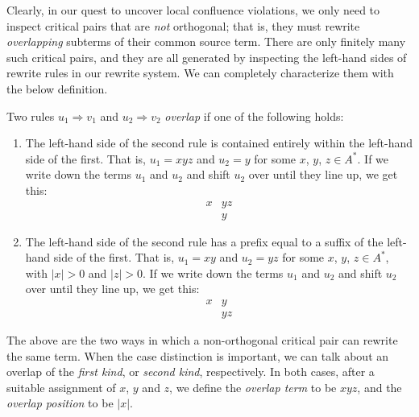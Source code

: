 \documentclass[../generics]{subfiles}
\begin{document}
Clearly, in our quest to uncover local confluence violations, we only need to inspect critical pairs that are \emph{not} orthogonal; that is, they must rewrite \emph{overlapping} subterms of their common source term. There are only finitely many such critical pairs, and they are all generated by inspecting the left-hand sides of rewrite rules in our rewrite system. We can completely characterize them with the below definition.
\begin{definition}\label{overlappingrules}
Two rules $u_1\Rightarrow v_1$ and $u_2\Rightarrow v_2$ \emph{overlap} if one of the following holds:
\begin{enumerate}
\item The left-hand side of the second rule is contained entirely within the left-hand side of the first. That is, $u_1=xyz$ and $u_2=y$ for some $x$, $y$, $z\in A^*$. If we write down the terms $u_1$ and $u_2$ and shift $u_2$ over until they line up, we get this:
\begin{align*}
x&yz\\
&y
\end{align*}
\item The left-hand side of the second rule has a prefix equal to a suffix of the left-hand side of the first. That is, $u_1=xy$ and $u_2=yz$ for some $x$, $y$, $z\in A^*$, with $|x|>0$ and $|z|>0$. If we write down the terms $u_1$ and $u_2$ and shift $u_2$ over until they line up, we get this:
\begin{align*}
x&y\\
&yz
\end{align*}
\end{enumerate}
The above are the two ways in which a non-orthogonal critical pair can rewrite the same term. When the case distinction is important, we can talk about an overlap of the \emph{first kind}, or \emph{second kind}, respectively. In both cases, after a suitable assignment of $x$, $y$ and $z$, we define the \emph{overlap term} to be $xyz$, and the \emph{overlap position} to be $|x|$.
\end{definition}
\end{document}
